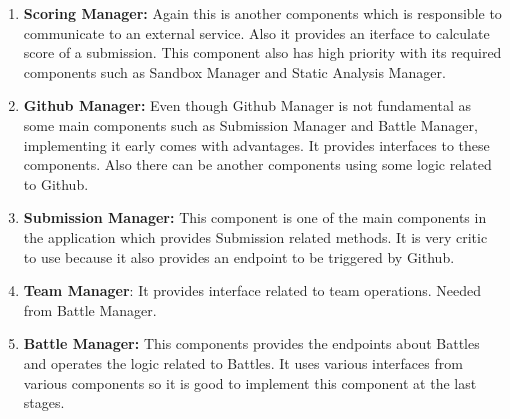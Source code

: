 \begin{enumerate}
    \item \textbf{Scoring Manager:} Again this is another components which is responsible to communicate to an external service. Also it provides an iterface to calculate score of a submission. This component also has high priority with its required components such as Sandbox Manager and Static Analysis Manager.
    \item \textbf{Github Manager:} Even though Github Manager is not fundamental as some main components such as Submission Manager and Battle Manager, implementing it early comes with advantages. It provides interfaces to these components. Also there can be another components using some logic related to Github. 
    \item \textbf{Submission Manager:} This component is one of the main components in the application which provides Submission related methods. It is very critic to use because it also provides an endpoint to be triggered by Github. 
    \item \textbf{Team Manager}: It provides interface related to team operations. Needed from Battle Manager.
    \item \textbf{Battle Manager:} This components provides the endpoints about Battles and operates the logic related to Battles. It uses various interfaces from various components so it is good to implement this component at the last stages.
\end{enumerate}

\newpage

